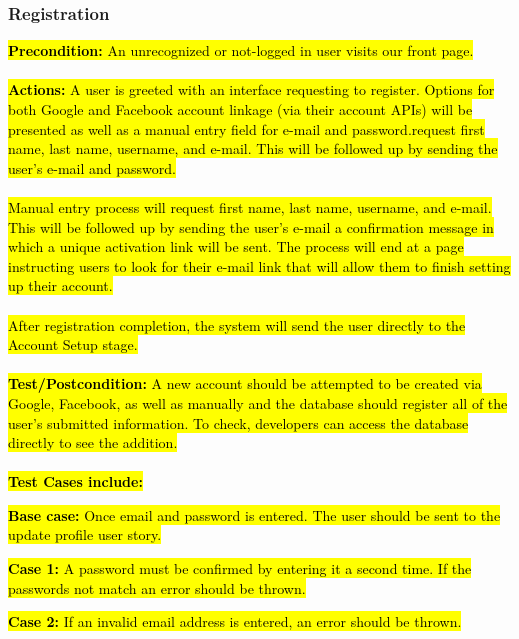 \documentclass[a4paper,12pt]{article}
\begin{document}
\subsubsection{Registration}
\hl{\textbf{Precondition:} An unrecognized or not-logged in user visits our front page.}\\
\\
\hl{\textbf{Actions:} A user is greeted with an interface requesting to register. Options for both Google and Facebook account linkage (via their account APIs) will be presented as well as a manual entry field for e-mail and password.request first name, last name, username, and e-mail. This will be followed up by sending the user's e-mail and password.\\
\\
Manual entry process will request first name, last name, username, and e-mail. This will be followed up by sending the user's e-mail a confirmation message in which a unique activation link will be sent. The process will end at a page instructing users to look for their e-mail link that will allow them to finish setting up their account.\\
\\
After registration completion, the system will send the user directly to the Account Setup stage.}\\
\\
\hl{\textbf{Test/Postcondition:} A new account should be attempted to be created via Google, Facebook, as well as manually and the database should register all of the user's submitted information.  To check, developers can access the database directly to see the addition.}\\
\\
\hl{\textbf{Test Cases include:}}
\begin{list}{•}{•}
\item \hl{\textbf{Base case: }Once email and password is entered. The user should be sent to the update profile user story.}
\item \hl{\textbf{Case 1: }A password must be confirmed by entering it a second time. If the passwords not match an error should be thrown.}
\item \hl{\textbf{Case 2: }If an invalid email address is entered, an error should be thrown.}
\end{list}
\end{document}
